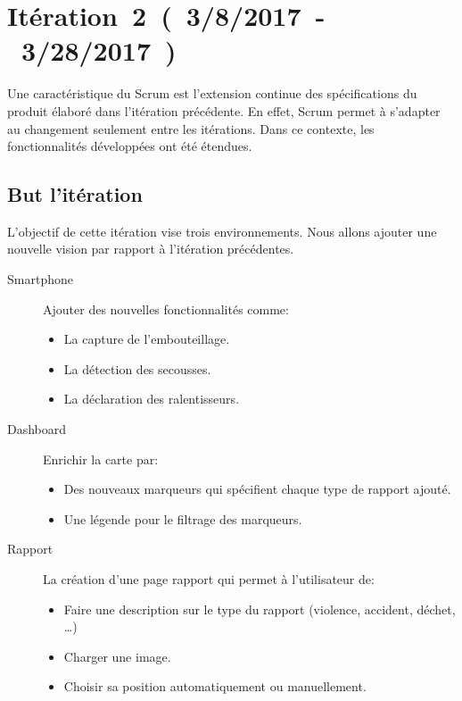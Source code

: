 \chapter{Itération~2~(~3/8/2017~-~3/28/2017~)}

Une caractéristique du Scrum est l'extension continue des spécifications du
produit élaboré dans l'itération précédente. En effet, Scrum permet à s'adapter
au changement seulement entre les itérations. Dans ce contexte, les
fonctionnalités développées ont été étendues.

\section{But l'itération}

L'objectif de cette itération vise trois environnements. Nous allons ajouter
une nouvelle vision par rapport à l'itération précédentes.

\begin{description}
    \item [Smartphone] Ajouter des nouvelles fonctionnalités comme:
        \begin{itemize}
            \item La capture de l'embouteillage.
            \item La détection des secousses.
            \item La déclaration des ralentisseurs.
        \end{itemize}
    \item [Dashboard] Enrichir la carte par:
        \begin{itemize}
            \item Des nouveaux marqueurs qui spécifient chaque type de rapport
                ajouté.
            \item Une légende pour le filtrage des marqueurs.
        \end{itemize}
    \item [Rapport] La création d'une page rapport qui permet à l'utilisateur
        de:
        \begin{itemize}
            \item Faire une description sur le type du rapport (violence,
                accident, déchet, \ldots)
            \item Charger une image.
            \item Choisir sa position automatiquement ou manuellement.
        \end{itemize}
\end{description}


